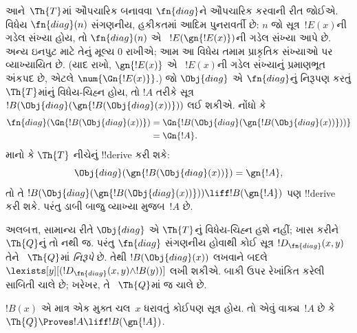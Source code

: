 \documentclass[../../../include/open-logic-section]{subfiles}
\begin{document}
\begin{explain}
આને~$\Th{T}$માં ઔપચારિક
બનાવવા $\fn{diag}$ને
ઔપચારિક કરવાની રીત
જોઈએ. વિધેય
$\fn{diag}(n)$ સંગણનીય,
હકીકતમાં આદિમ પુનરાવર્તી
છે: $n$ જો
સૂત્ર~$!E(x)$ની ગડેલ
સંખ્યા હોય, તો
$\fn{diag}(n)$ એ
~$!E(\gn{!E(x)})$ની
ગડેલ સંખ્યા આપે છે. અન્ય ઇનપુટ માટે તેનું મૂલ્ય
$0$ રાખીએ; આમ આ વિધેય તમામ પ્રાકૃતિક સંખ્યાઓ
પર વ્યાખ્યાયિત છે.
(યાદ રાખો,
$\gn{!E(x)}$ એ
~$!E(x)$ની ગડેલ સંખ્યાનું
પ્રમાણભૂત અંકપદ છે,
એટલે $\num{\Gn{!E(x)}}$.)
જો $\Obj{diag}$ એ
$\fn{diag}$નું નિરૂપણ
કરતું $\Th{T}$માંનું
વિધેય-ચિહ્ન હોય,
તો $!A$ તરીકે સૂત્ર
$!B(\Obj{diag}(\gn{!B(\Obj{diag}(x))}))$
લઈ શકીએ. નોંધો કે
\begin{align*}
\fn{diag}(\Gn{!B(\Obj{diag}(x))}) & =
\Gn{!B(\Obj{diag}(\gn{!B(\Obj{diag}(x))}))} \\
& = \Gn{!A}.
\end{align*}
માનો કે $\Th{T}$ નીચેનું
!!{derive} કરી શકે:
\[
\Obj{diag}(\gn{!B(\Obj{diag}(x))}) = \gn{!A},
\]
તો તે
$!B(\Obj{diag}(\gn{!B(\Obj{diag}(x))}))
\liff !B(\gn{!A})$
પણ !!{derive} કરી શકે.
પરંતુ ડાબી બાજુ
વ્યાખ્યા મુજબ~$!A$ છે.

અલબત્ત, સામાન્ય રીતે
$\Obj{diag}$ એ
$\Th{T}$નું વિધેય-ચિહ્ન
હશે નહીં; ખાસ કરીને
~$\Th{Q}$નું તો નથી જ.
પરંતુ $\fn{diag}$ સંગણનીય
હોવાથી કોઈ સૂત્ર
$!D_{\fn{diag}}(x,y)$ તેને
~$\Th{Q}$માં
\emph{નિરૂપે} છે.
તેથી $!B(\Obj{diag}(x))$
લખવાને બદલે
$\lexists[y][(!D_{\fn{diag}}(x,y) \land !B(y))]$
લખી શકીએ. બાકી ઉપર
રેખાંકિત કરેલી સાબિતી
ચાલે છે; ખરેખર, તે
~$\Th{Q}$માં જ ચાલે છે.
\end{explain}

\begin{lem}
$!B(x)$ એ માત્ર એક
મુક્ત ચલ~$x$ ધરાવતું
કોઈપણ સૂત્ર હોય.
તો એવું વાક્ય~$!A$ છે કે
$\Th{Q} \Proves
!A \liff !B(\gn{!A})$.
\end{lem}
\end{document}

